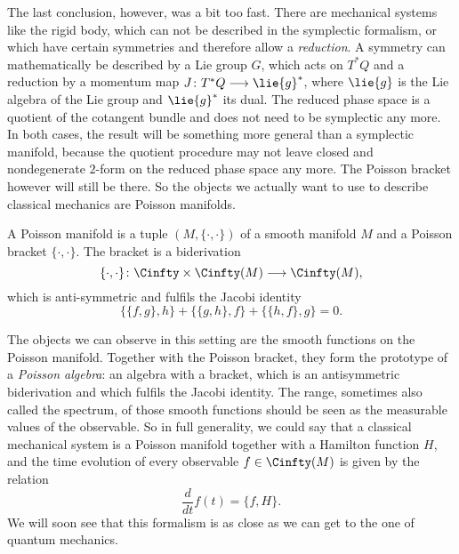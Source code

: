 The last conclusion, however, was a bit too fast. There are mechanical systems 
like the rigid body, which can not be described in the symplectic formalism, 
or which have certain symmetries and therefore allow a \emph{reduction}. A 
symmetry can mathematically be described by a Lie group $G$, which acts on 
$T^*Q$ and a reduction by a momentum map $J \colon T^*Q \longrightarrow 
\lie{g}^*$, where $\lie{g}$ is the Lie algebra of the Lie group and $\lie{g}^*$ 
its dual. The reduced phase space is a quotient of the cotangent bundle and 
does not need to be symplectic any more. In both cases, the result will 
be something more general than a symplectic manifold, because the quotient 
procedure may not leave closed and nondegenerate $2$-form on the reduced phase 
space any more. The Poisson bracket however will still be there. So the objects we 
actually want to use to describe classical mechanics are Poisson manifolds. 
\begin{definition}
	A Poisson manifold is a tuple $(M, \{ \cdot, \cdot \})$ of a smooth 
	manifold $M$ and a Poisson bracket $\{ \cdot, \cdot\}$. The bracket is a 
	biderivation
	\begin{equation*}
		\{ \cdot, \cdot \}
		\colon
		\Cinfty
		\times
		\Cinfty(M)
		\longrightarrow
		\Cinfty(M),
	\end{equation*}
	which is anti-symmetric and fulfils the Jacobi identity
	\begin{equation*}
		\{ \{f, g\}, h \}
		+
		\{ \{g, h\}, f \}
		+
		\{ \{h, f\}, g \}
		=
		0.
	\end{equation*}
\end{definition}
The objects we can observe in this setting are the smooth functions on the Poisson 
manifold. Together with the Poisson bracket, they form the prototype of a 
\emph{Poisson algebra}: an algebra with a bracket, which is an antisymmetric 
biderivation and which fulfils the Jacobi identity. The range, sometimes also 
called the spectrum, of those smooth functions should be seen as the measurable 
values of the observable. So in full generality, we could say that a classical 
mechanical system is a Poisson manifold together with a Hamilton function $H$, and 
the time evolution of every observable $f \in \Cinfty(M)$ is given by the relation
\begin{equation*}
	\frac{d}{dt} f(t)
	=
	\{f, H\}.
\end{equation*}
We will soon see that this formalism is as close as we can get to the one of 
quantum mechanics.



